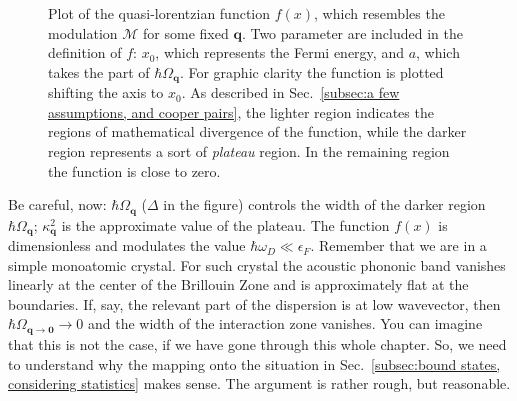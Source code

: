 \begin{figure}
	\centering
	
	\caption{Plot of the quasi-lorentzian function $f(x)$, which resembles the modulation $\mathcal{M}$ for some fixed $\mathbf{q}$. Two parameter are included in the definition of $f$: $x_0$, which represents the Fermi energy, and $a$, which takes the part of $\hbar\Omega_\mathbf{q}$. For graphic clarity the function is plotted shifting the axis to $x_0$. As described in Sec.~\ref{subsec:a few assumptions, and cooper pairs}, the lighter region indicates the regions of mathematical divergence of the function, while the darker region represents a sort of \textit{plateau} region. In the remaining region the function is close to zero.}
	\label{fig:quasi-lorentzian function bcs}
\end{figure}

Be careful, now: $\hbar\Omega_\mathbf{q}$ ($\Delta$ in the figure) controls the width of the darker region $\hbar\Omega_\mathbf{q}$; $\kappa_\mathbf{q}^2$ is the approximate value of the plateau. The function $f(x)$ is dimensionless and modulates the value $\hbar\omega_D \ll \epsilon_F$.
Remember that we are in a simple monoatomic crystal. For such crystal the acoustic phononic band vanishes linearly at the center of the Brillouin Zone and is approximately flat at the boundaries. If, say, the relevant part of the dispersion is at low wavevector, then $\hbar\Omega_{\mathbf{q}\to\mathbf{0}}\to0$ and the width of the interaction zone vanishes. You can imagine that this is not the case, if we have gone through this whole chapter.
So, we need to understand why the mapping onto the situation in Sec.~\ref{subsec:bound states, considering statistics} makes sense. The argument is rather rough, but reasonable.

